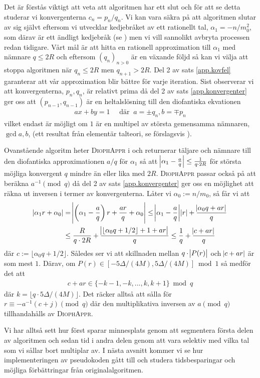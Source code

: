 Det är förstås viktigt att veta att algoritmen har ett slut och för att se detta studerar vi konvergenterna \(c_n = p_n / q_n\). Vi kan vara säkra på att algoritmen slutar av sig självt eftersom vi utvecklar kedjebråket av ett rationellt tal, \(\alpha_1 = - n / m_0^2\), som därav är ett ändligt kedjebråk (se \cite[Sats 21.5]{Lindahl}) men vi vill sannolikt avbryta processen redan tidigare. Vårt mål är att hitta en rationell approximation till \(\alpha_1\) med nämnare \(q \leq 2R\) och eftersom \((q_n)_{n>0}\) är en växande följd så kan vi välja att stoppa algoritmen när \(q_n \leq 2 R\) men \(q_{n + 1} > 2R\). Del 2 av sats \ref{app.kovfel} garanterar att vår approximation blir bättre för varje iteration. Sist observerar vi att konvergenterna, \(p_n, q_n\), är relativt prima då del 2 av sats \ref{app.konvergenter} ger oss att \((p_{n-1}, q_{n-1})\) är en heltalslösning till den diofantiska ekvationen
\begin{align*}
    a x + b y = 1 \quad \text{ där }\ a = \pm q_n, b = \mp p_n
\end{align*}
vilket endast är möjligt om \(1\) är en multipel av största gemensamma nämnaren, \(\gcd{a,b}\), (ett resultat från elementär talteori, se förslagsvis \cite[Sats 3.1]{Lindahl}). 

Ovanstående algoritm heter \textsc{DiophAppr} i \cite{HaraldSieve} och returnerar täljare och nämnare till den diofantiska approximationen \(a/q\) för \(\alpha_1\) så att \(\abs{\alpha_1 - \frac{a}{q}} \leq \frac{1}{q \cdot 2R}\) för största möjliga konvergent $q$ mindre än eller lika med \(2R\). \textsc{DiophAppr} passar också på att beräkna \(a^{-1} \pmod{q}\) då del 2 av sats \ref{app.konvergenter} ger oss en möjlighet att räkna ut inversen i termer av konvergenterna. Låter vi \(\alpha_0 := n / m_0\), så får vi att 
\begin{align*}
    \abs{\alpha_1 r + \alpha_0} &= \abs{\left(\alpha_1 - \frac{a}{q}\right) r + \frac{ar}{q} + \alpha_0} \leq 
    \abs{\alpha_1 - \frac{a}{q}} \abs{r} + \frac{\abs{\alpha_0 q + ar}}{q} \\
    &\leq \frac{R}{q \cdot 2R} + \frac{\abs{\lfloor \alpha_0 q + 1/2 \rfloor + 1 + ar}}{q} \leq
    \frac{1}{q} + \frac{\abs{c + ar}}{q}
\end{align*}
där \(c := \lfloor \alpha_0 q + 1/2 \rfloor\). Således ser vi att skillnaden mellan \(q \cdot \abs{P(r)}\) och \(\abs{c + ar}\) är som mest \(1\). Därav, om \(P(r) \in [-5\Delta/(4M), 5\Delta/(4M)] \bmod 1\) så medför det att
\begin{align*}
    c + ar \in \{- k - 1, - k, ... , k, k + 1\} \bmod q
\end{align*}
där \(k = \lfloor q \cdot 5\Delta/(4M) \rfloor\). Det räcker alltså att sålla för \(r \equiv - a^{-1} (c + j) \pmod{q}\) där den multiplikativa inversen av $a \pmod{q}$ tillhandahålls av \textsc{DiophAppr}.

Vi har alltså sett hur \cite{HaraldSieve} först sparar minnesplats genom att segmentera första delen av algoritmen och sedan tid i andra delen genom att vara selektiv med vilka tal som vi sållar bort multiplar av. I nästa avsnitt kommer vi se hur implementeringen av pseudokoden \cite{HaraldSieve} gått till och studera tidsbesparingar och möjliga förbättringar från originalalgoritmen.